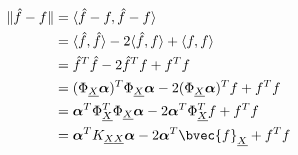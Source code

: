 \documentclass[twoside]{article} \usepackage{aistats2017}
\begin{document}
		\begin{equation}
		\begin{aligned}
			\Vert \hat{f} - f \Vert &= \langle \hat{f} - f, \hat{f} - f \rangle \\
			&= \langle \hat{f}, \hat{f} \rangle - 2 \langle \hat{f}, f \rangle + \langle f, f \rangle \\
			&=  \hat{f}^{T} \hat{f} - 2 \hat{f}^{T} f + f^{T} f \\
			&= (\Phi_{\underline{X}} \bm{\alpha})^{T} \Phi_{\underline{X}}  \bm{\alpha} - 2 (\Phi_{\underline{X}}  \bm{\alpha})^{T} f + f^{T} f \\
			&= \bm{\alpha}^{T} \Phi_{\underline{X}} ^{T} \Phi_{\underline{X}}  \bm{\alpha} - 2 \bm{\alpha}^{T} \Phi_{\underline{X}} ^{T} f + f^{T} f \\
			&= \bm{\alpha}^{T} K_{\underline{X} \underline{X}}  \bm{\alpha} - 2 \bm{\alpha}^{T} \bvec{f}_{\underline{X}} + f^{T} f \\
			\end{aligned}
		\label{eq:approximate_embedding_derivation}
		\end{equation}
		
\end{document}
